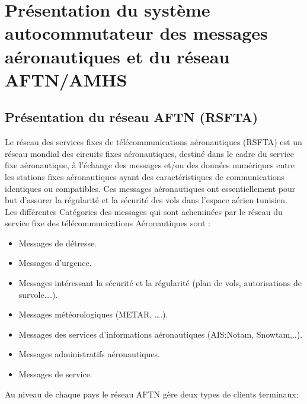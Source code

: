 \section{Présentation du système autocommutateur des messages aéronautiques et du réseau AFTN/AMHS}

\subsection{Présentation du réseau AFTN (RSFTA)}

Le réseau des services fixes de télécommunications aéronautiques (RSFTA)  est un réseau mondial des circuits fixes aéronautiques, destiné dans le cadre du service fixe aéronautique, à l’échange des messages et/ou des données numériques entre les stations fixes aéronautiques ayant des caractéristiques de communications identiques ou compatibles. Ces messages aéronautiques ont essentiellement pour but d’assurer la régularité et la sécurité des vols  dans l’espace aérien tunisien. \\ 

Les différentes Catégories des messages qui sont  acheminées par le réseau du service fixe des télécommunications Aéronautiques sont : \\


\begin{itemize}
\item Messages de détresse. \\
\item Messages d’urgence. \\
\item Messages intéressant la sécurité et la régularité (plan de vols, autorisations de survole….). \\
\item Messages météorologiques (METAR, ….). \\
\item Messages des services d’informations aéronautiques (AIS:Notam, Snowtam,..). \\
\item Messages administratifs aéronautiques. \\
\item Messages de service. \\
\end{itemize}
Au niveau de chaque pays le réseau AFTN gère deux types de clients terminaux: \\

